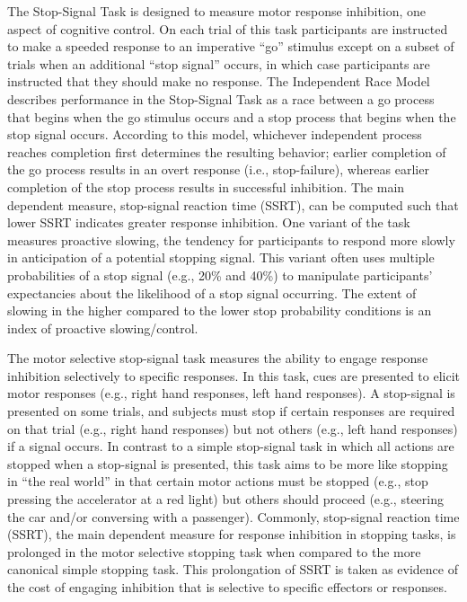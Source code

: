 \documentclass[sn-mathphys,Numbered, super]{sn-jnl}
\begin{document}
The Stop-Signal Task is designed to measure motor response inhibition, one aspect of cognitive control. On each trial of this task participants are instructed to make a speeded response to an imperative ``go'' stimulus except on a subset of trials when an additional ``stop signal'' occurs, in which case participants are instructed that they should make no response. The Independent Race Model describes performance in the Stop-Signal Task as a race between a go process that begins when the go stimulus occurs and a stop process that begins when the stop signal occurs. According to this model, whichever independent process reaches completion first determines the resulting behavior; earlier completion of the go process results in an overt response (i.e., stop-failure), whereas earlier completion of the stop process results in successful inhibition. The main dependent measure, stop-signal reaction time (SSRT), can be computed such that lower SSRT indicates greater response inhibition. One variant of the task measures proactive slowing, the tendency for participants to respond more slowly in anticipation of a potential stopping signal. This variant often uses multiple probabilities of a stop signal (e.g., 20\% and 40\%) to manipulate participants’ expectancies about the likelihood of a stop signal occurring. The extent of slowing in the higher compared to the lower stop probability conditions is an index of proactive slowing/control.

The motor selective stop-signal task measures the ability to engage response inhibition selectively to specific responses. In this task, cues are presented to elicit motor responses (e.g., right hand responses, left hand responses). A stop-signal is presented on some trials, and subjects must stop if certain responses are required on that trial (e.g., right hand responses) but not others (e.g., left hand responses) if a signal occurs. In contrast to a simple stop-signal task in which all actions are stopped when a stop-signal is presented, this task aims to be more like stopping in ``the real world'' in that certain motor actions must be stopped (e.g., stop pressing the accelerator at a red light) but others should proceed (e.g., steering the car and/or conversing with a passenger). Commonly, stop-signal reaction time (SSRT), the main dependent measure for response inhibition in stopping tasks, is prolonged in the motor selective stopping task when compared to the more canonical simple stopping task. This prolongation of SSRT is taken as evidence of the cost of engaging inhibition that is selective to specific effectors or responses.
\end{document}
